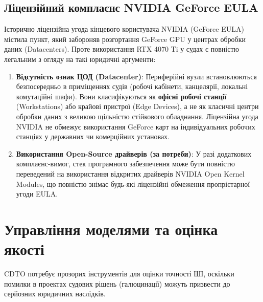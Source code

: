 \documentclass{article}
\begin{document}
\subsection{Ліцензійний комплаєнс NVIDIA GeForce EULA}
Історично ліцензійна угода кінцевого користувача NVIDIA (GeForce EULA) містила пункт, який забороняв розгортання GeForce GPU у центрах обробки даних (Datacenters). Проте використання RTX 4070 Ti у судах є повністю легальним з огляду на такі юридичні аргументи:
\begin{enumerate}
\item \textbf{Відсутність ознак ЦОД (Datacenter)}: Периферійні вузли встановлюються безпосередньо в приміщеннях судів (робочі кабінети, канцелярії, локальні комутаційні шафи). Вони класифікуються як \textbf{офісні робочі станції} (Workstations) або крайові пристрої (Edge Devices), а не як класичні центри обробки даних з великою щільністю стійкового обладнання. Ліцензійна угода NVIDIA не обмежує використання GeForce карт на індивідуальних робочих станціях у державних чи комерційних установах.
\item \textbf{Використання Open-Source драйверів (за потреби)}: У разі додаткових комплаєнс-вимог, стек програмного забезпечення може бути повністю переведений на використання відкритих драйверів NVIDIA Open Kernel Modules, що повністю знімає будь-які ліцензійні обмеження пропрієтарної угоди EULA.
\end{enumerate}

\section{Управління моделями та оцінка якості}
CDTO потребує прозорих інструментів для оцінки точності ШІ, оскільки помилки в проектах судових рішень (галюцинації) можуть призвести до серйозних юридичних наслідків.
\end{document}
